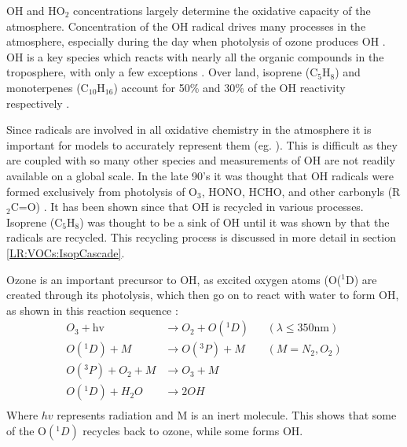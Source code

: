     
    OH and HO$_2$ concentrations largely determine the oxidative capacity of the atmosphere.
    Concentration of the OH radical drives many processes in the atmosphere, especially during the day when photolysis of ozone produces OH \parencite{Atkinson2000}.
    OH is a key species which reacts with nearly all the organic compounds in the troposphere, with only a few exceptions \parencite{Atkinson2000}.
    Over land, isoprene (C$_5$H$_8$) and monoterpenes (C$_{10}$H$_{16}$) account for 50\% and 30\% of the OH reactivity respectively \parencite{Fuentes2000}.
    
    Since radicals are involved in all oxidative chemistry in the atmosphere it is important for models to accurately represent them (eg. \textcite{Travis2014}).
    This is difficult as they are coupled with so many other species and measurements of OH are not readily available on a global scale.
    In the late 90's it was thought that OH radicals were formed exclusively from photolysis of O$_3$, HONO, HCHO, and other carbonyls (R$_2$C=O) \parencite{Atkinson2000}.
    It has been shown since that OH is recycled in various processes.
    Isoprene (C$_5$H$_8$) was thought to be a sink of OH until it was shown by \textcite{Paulot2009b} that the radicals are recycled.
    This recycling process is discussed in more detail in section \ref{LR:VOCs:IsopCascade}.
    
    Ozone is an important precursor to OH, as excited oxygen atoms (O(${}^1$D) are created through its photolysis, which then go on to react with water to form OH, as shown in this reaction sequence \parencite{Atkinson2000, AtkinsonArey2003}:
    \begin{equation}
      \begin{aligned}
        O_3+\text{hv}     & \to  O_2 + O({}^1D)   && (\lambda \le 350 \text{nm}) \\%
        O({}^1D)+M        & \to  O({}^3P) + M     && (M=N_2, O_2)               \\%
        O({}^3P)+O_2 + M  & \to  O_3 + M          &&                           \\%
        O({}^1D)+H_2O     & \to  2OH              &&                            \\%
      \end{aligned}
      \label{LR:Atmos:Chem:eqn_O3toOH}
    \end{equation}
    Where $hv$ represents radiation and M is an inert molecule.
    This shows that some of the O$({}^1D)$ recycles back to ozone, while some forms OH.
      

